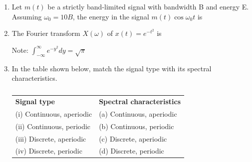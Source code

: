 \documentclass[a4paper, 11pt]{article}
\begin{document}
\begin{enumerate}
    \hfill{}
    
    \item Let $m(t)$ be a strictly band-limited signal with bandwidth B and energy E. Assuming $\omega_0 = 10B$, the energy in the signal $m(t) \cos \omega_0 t$ is
    \begin{enumerate}
    \end{enumerate}
    
    \hfill{}

    \item The Fourier transform $X(\omega)$ of $x(t) = e^{-t^2}$ is
    
    Note: $\int_{-\infty}^{\infty} e^{-y^2} dy = \sqrt{\pi}$
    
    \begin{enumerate}
    \end{enumerate}
    
    \hfill{}

    \item In the table shown below, match the signal type with its spectral characteristics.
    
    \begin{table}[H]
        \centering
        \begin{tabular}{ll}
            \textbf{Signal type} & \textbf{Spectral characteristics} \\
            (i) Continuous, aperiodic & (a) Continuous, aperiodic \\
            (ii) Continuous, periodic & (b) Continuous, periodic \\
            (iii) Discrete, aperiodic & (c) Discrete, aperiodic \\
            (iv) Discrete, periodic & (d) Discrete, periodic \\
        \end{tabular}
        \caption*{}
    \end{table}


\end{enumerate}
\end{document}

